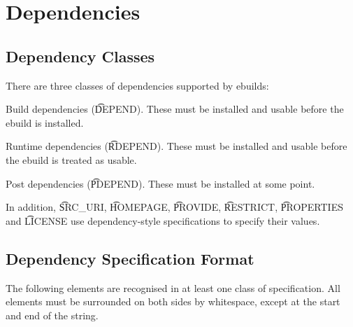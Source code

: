 \chapter{Dependencies}
\label{sec:dependencies}

\section{Dependency Classes}

There are three classes of dependencies supported by ebuilds:

\begin{compactitem}
\item Build dependencies (\t{DEPEND}). These must be installed and usable before the ebuild
    is installed.
\item Runtime dependencies (\t{RDEPEND}). These must be installed and usable before the ebuild
    is treated as usable.
\item Post dependencies (\t{PDEPEND}). These must be installed at some point.
\end{compactitem}

In addition, \t{SRC\_URI}, \t{HOMEPAGE}, \t{PROVIDE}, \t{RESTRICT}, \t{PROPERTIES} and \t{LICENSE}
use dependency-style specifications to specify their values.

\section{Dependency Specification Format}

The following elements are recognised in at least one class of specification. All elements must
be surrounded on both sides by whitespace, except at the start and end of the string.

